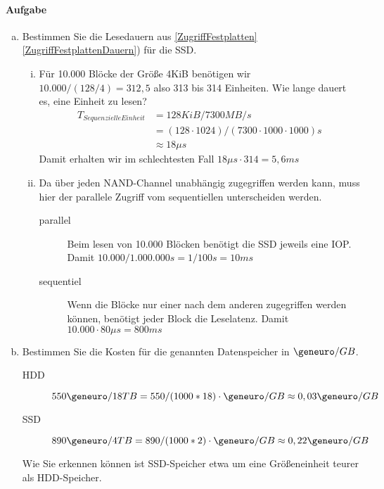 \paragraph{Aufgabe}
\begin{enumerate}[a)]
	\item Bestimmen Sie die Lesedauern aus \ref{ZugriffFestplatten} \ref{ZugriffFestplattenDauern}) für die SSD.

	\begin{solution}
	\begin{enumerate}[i)]
		\item Für 10.000 Blöcke der Größe 4KiB benötigen wir $10.000/(128/4) = 312,5$ also 313 bis 314 Einheiten.
		Wie lange dauert es, eine Einheit zu lesen?
		\begin{align*}
			T_{SequenzielleEinheit} &= 128KiB/7300 MB/s\\
			&= (128 \cdot 1024) /(7300 \cdot 1000\cdot 1000) s  \\
			&\approx 18 \mu s
		\end{align*}
		Damit erhalten wir im schlechtesten Fall $18\mu s \cdot 314 = 5,6ms$
		\item Da über jeden NAND-Channel unabhängig zugegriffen werden kann, muss hier der parallele Zugriff vom sequentiellen unterscheiden werden.
		\begin{description}
			\item[parallel] Beim lesen von 10.000 Blöcken benötigt die SSD jeweils eine IOP.
			Damit $10.000/1.000.000 s = 1/100 s = 10 ms$
			\item[sequentiel] Wenn die Blöcke nur einer nach dem anderen zugegriffen werden können, benötigt jeder Block die Leselatenz.
			Damit $10.000\cdot 80\mu s = 800 ms$
		\end{description}
	\end{enumerate}
	\end{solution}

	\item Bestimmen Sie die Kosten für die genannten Datenspeicher in $\geneuro/GB$.
	
	\begin{solution}
		\begin{description}
			\item[HDD] $550\geneuro / 18TB = 550 / (1000*18) \cdot \geneuro/GB \approx 0,03 \geneuro/GB$
			\item[SSD] $890\geneuro / 4TB = 890 /(1000*2) \cdot \geneuro/GB \approx 0,22 \geneuro/GB$
		\end{description}
	Wie Sie erkennen können ist SSD-Speicher etwa um eine Größeneinheit teurer als HDD-Speicher.
	\end{solution}



\end{enumerate}
